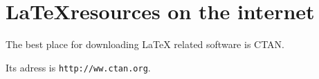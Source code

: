 \documentclass{article}
\begin{document}
  \section{\textsf{\LaTeX resources on the internet}}
    The best place for downloading LaTeX related software is CTAN.

    Its adress is \texttt{http://ww.ctan.org}.
\end{document}
